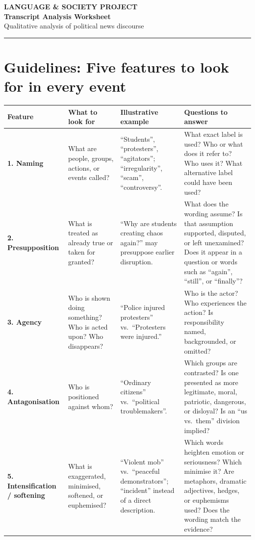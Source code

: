 \documentclass[10pt,a4paper]{article}
\begin{document}
\clearpage
\setcounter{page}{1}

\begin{center}
{\large\textbf{LANGUAGE \& SOCIETY PROJECT}}\\[4pt]
{\LARGE\textbf{Transcript Analysis Worksheet}}\\[4pt]
{\normalsize Qualitative analysis of political news discourse}
\end{center}
\vspace{2pt}
\noindent\rule{\textwidth}{0.4pt}

\section*{Guidelines: Five features to look for in every event}

\begin{center}
\small
\begin{tabular}{@{}>{\raggedright\arraybackslash}p{} >{\raggedright\arraybackslash}p{} >{\raggedright\arraybackslash}p{} >{\raggedright\arraybackslash}p{}@{}}
\toprule
\textbf{Feature} & \textbf{What to look for} & \textbf{Illustrative example} & \textbf{Questions to answer} \\
\midrule
\textbf{1. Naming} & What are people, groups, actions, or events called? & ``Students'', ``protesters'', ``agitators''; ``irregularity'', ``scam'', ``controversy''. & What exact label is used? Who or what does it refer to? Who uses it? What alternative label could have been used? \\[6pt]
\textbf{2. Presupposition} & What is treated as already true or taken for granted? & ``Why are students creating chaos again?'' may presuppose earlier disruption. & What does the wording assume? Is that assumption supported, disputed, or left unexamined? Does it appear in a question or words such as ``again'', ``still'', or ``finally''? \\[6pt]
\textbf{3. Agency} & Who is shown doing something? Who is acted upon? Who disappears? & ``Police injured protesters'' vs.\ ``Protesters were injured.'' & Who is the actor? Who experiences the action? Is responsibility named, backgrounded, or omitted? \\[6pt]
\textbf{4. Antagonisation} & Who is positioned against whom? & ``Ordinary citizens'' vs.\ ``political troublemakers''. & Which groups are contrasted? Is one presented as more legitimate, moral, patriotic, dangerous, or disloyal? Is an ``us vs.\ them'' division implied? \\[6pt]
\textbf{5. Intensification / softening} & What is exaggerated, minimised, softened, or euphemised? & ``Violent mob'' vs.\ ``peaceful demonstrators''; ``incident'' instead of a direct description. & Which words heighten emotion or seriousness? Which minimise it? Are metaphors, dramatic adjectives, hedges, or euphemisms used? Does the wording match the evidence? \\
\bottomrule
\end{tabular}
\end{center}
\end{document}

